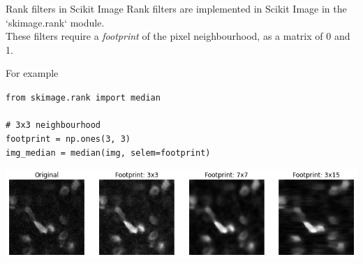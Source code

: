 \documentclass[9pt, aspectratio=169]{beamer}
\begin{document}
\begin{frame}
    {Rank filters in Scikit Image}
    Rank filters are implemented in Scikit Image in the `skimage.rank` module.\\
    These filters require a \textit{footprint} of the pixel neighbourhood, as a matrix of 0 and 1.

    For example

    \begin{codebox}
        \texttt{from skimage.rank import median\\
            \\
            \# 3x3 neighbourhood\\
            footprint = np.ones(3, 3)\\
            img\_median = median(img, selem=footprint)
        }
    \end{codebox}
    \centering
    \includegraphics[width=.85\textwidth]{median_filter_different_footprints.png}
\end{frame}
\end{document}
